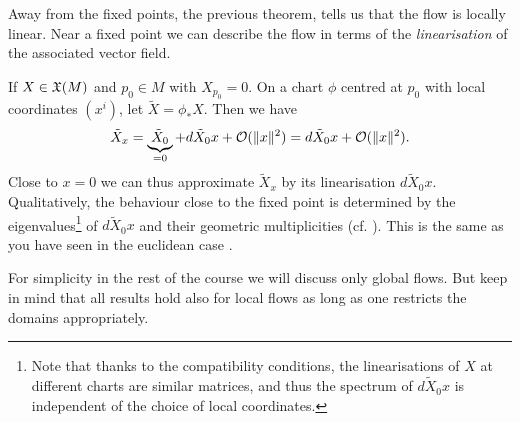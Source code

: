 \begin{remark}
  Away from the fixed points, the previous theorem, tells us that the flow is locally linear.
  Near a fixed point we can describe the flow in terms of the \emph{linearisation} of the associated vector field.

  If $X\in\mathfrak{X}(M)$ and $p_0\in M$ with $X_{p_0} = 0$. On a chart $\phi$ centred at $p_0$ with local coordinates $(x^i)$, let $\tilde X = \phi_* X$.
  Then we have
  \begin{equation}
    \tilde X_x = \underbrace{\tilde X_0}_{=0} + d\tilde X_0 x + \mathcal{O}(\|x\|^2) = d\tilde X_0 x + \mathcal{O}(\|x\|^2).
  \end{equation}
  Close to $x=0$ we can thus approximate $\tilde X_x$ by its linearisation $ d\tilde X_0 x$.
  Qualitatively, the behaviour close to the fixed point is determined by the eigenvalues\footnote{Note that thanks to the compatibility conditions, the linearisations of $X$ at different charts are similar matrices, and thus the spectrum of $d\tilde X_0 x$ is independent of the choice of local coordinates.} of $d\tilde X_0 x$ and their geometric multiplicities (cf. \cite[Figure 9.8]{book:lee}). This is the same as you have seen in the euclidean case \cite[Chapter 5.3]{book:knauf}.
\end{remark}

\begin{tcolorbox}
For simplicity in the rest of the course we will discuss only global flows.
But keep in mind that all results hold also for local flows as long as one restricts the domains appropriately.
\end{tcolorbox}
